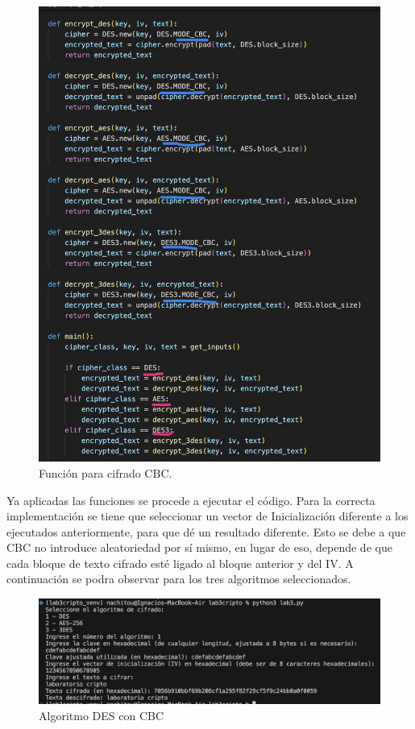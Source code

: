 \documentclass[letter,12pt]{article}
\begin{document}
\begin{figure}[H]
    \centering
    \includegraphics[width=0.8\linewidth]{imagenes/codigo cbc.jpg}
    \caption{Función para cifrado CBC.}
    \label{fig:enter-label}
\end{figure}

Ya aplicadas las funciones se procede a ejecutar el código. Para la correcta implementación se tiene que seleccionar un vector de Inicialización diferente a los ejecutados anteriormente, para que dé un resultado diferente. Esto se debe a que CBC no introduce aleatoriedad por sí mismo, en lugar de eso, depende de que cada bloque de texto cifrado esté ligado al bloque anterior y del IV. A continuación se podra observar para los tres algoritmos seleccionados.


\begin{figure}[H]
    \centering
    \includegraphics[width=0.8\linewidth]{imagenes/cbc des.jpg}
    \caption{Algoritmo DES con CBC}
    \label{fig:enter-label}
\end{figure}
\end{document}
